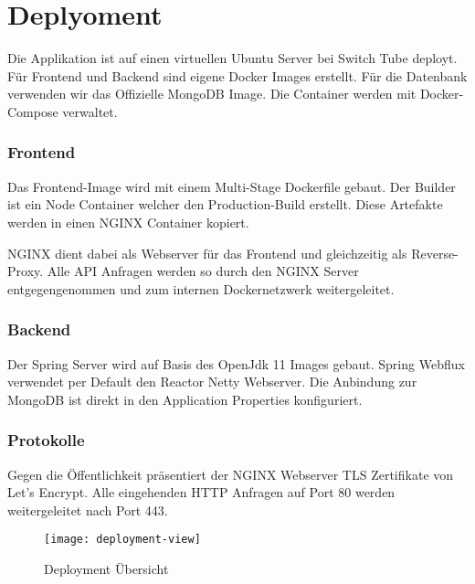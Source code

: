 \section{Deplyoment}

Die Applikation ist auf einen virtuellen Ubuntu Server bei Switch Tube deployt.
Für Frontend und Backend sind eigene Docker Images erstellt.
Für die Datenbank verwenden wir das Offizielle MongoDB Image.
Die Container werden mit Docker-Compose verwaltet.

\subsubsection*{Frontend}
Das Frontend-Image wird mit einem Multi-Stage Dockerfile gebaut.
Der Builder ist ein Node Container welcher den Production-Build erstellt.
Diese Artefakte werden in einen NGINX Container kopiert.

NGINX dient dabei als Webserver für das Frontend und gleichzeitig als Reverse-Proxy.
Alle API Anfragen werden so durch den NGINX Server entgegengenommen und zum internen Dockernetzwerk weitergeleitet.

\subsubsection*{Backend}
Der Spring Server wird auf Basis des OpenJdk 11 Images gebaut.
Spring Webflux verwendet per Default den Reactor Netty Webserver.
Die Anbindung zur MongoDB ist direkt in den Application Properties konfiguriert.


\subsubsection*{Protokolle}
Gegen die Öffentlichkeit präsentiert der NGINX Webserver TLS Zertifikate von Let's Encrypt.
Alle eingehenden HTTP Anfragen auf Port 80 werden weitergeleitet nach Port 443.


\begin{figure}[H]
    \texttt{[image: deployment-view]}
    \caption{Deployment Übersicht}
    \label{fig:Deplyoment}
\end{figure}
